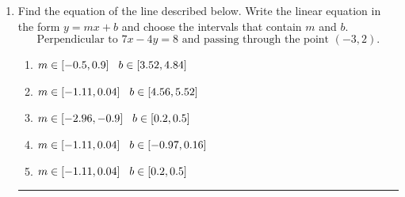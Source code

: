 \documentclass[14pt]{extbook}
\newcommand{\litem}[1]{\item#1\hspace*{-1cm}\rule{\textwidth}{0.4pt}}
\begin{document}
\begin{enumerate}
{\begin{enumerate}[label=\Alph*.]
\end{enumerate} }
\litem{
Find the equation of the line described below. Write the linear equation in the form $ y=mx+b $ and choose the intervals that contain $m$ and $b$.\[ \text{Perpendicular to } 7 x - 4 y = 8 \text{ and passing through the point } (-3, 2). \]\begin{enumerate}[label=\Alph*.]
\item \( m \in [-0.5, 0.9] \hspace*{3mm} b \in [3.52, 4.84] \)
\item \( m \in [-1.11, 0.04] \hspace*{3mm} b \in [4.56, 5.52] \)
\item \( m \in [-2.96, -0.9] \hspace*{3mm} b \in [0.2, 0.5] \)
\item \( m \in [-1.11, 0.04] \hspace*{3mm} b \in [-0.97, 0.16] \)
\item \( m \in [-1.11, 0.04] \hspace*{3mm} b \in [0.2, 0.5] \)

\end{enumerate} }
\end{enumerate}
\end{document}
